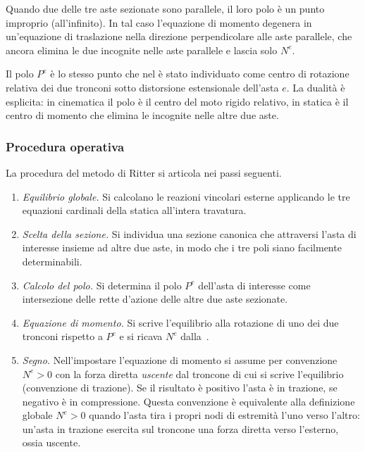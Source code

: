Quando due delle tre aste sezionate sono parallele,
il loro polo è un punto improprio (all'infinito).
In tal caso l'equazione di momento degenera in
un'equazione di traslazione nella direzione
perpendicolare alle aste parallele, che ancora
elimina le due incognite nelle aste parallele e
lascia solo $N^e$.

\begin{oss}
	Il polo $P^e$ è lo stesso punto che nel
	 è stato
	individuato come centro di rotazione relativa
	dei due tronconi sotto distorsione estensionale
	dell'asta $e$. La dualità è esplicita: in
	cinematica il polo è il centro del moto rigido
	relativo, in statica è il centro di momento che
	elimina le incognite nelle altre due aste.
\end{oss}

\subsubsection{Procedura operativa} La procedura del metodo di Ritter si articola nei
passi seguenti.

\begin{enumerate}[noitemsep]
	\item \emph{Equilibrio globale.} Si calcolano
	le reazioni vincolari esterne applicando
	le tre equazioni cardinali della statica
	all'intera travatura.
	\item \emph{Scelta della sezione.} Si individua
	una sezione canonica che attraversi l'asta
	di interesse insieme ad altre due aste, in
	modo che i tre poli siano facilmente
	determinabili.
	\item \emph{Calcolo del polo.} Si determina il
	polo $P^e$ dell'asta di interesse come
	intersezione delle rette d'azione delle
	altre due aste sezionate.
	\item \emph{Equazione di momento.} Si scrive
	l'equilibrio alla rotazione di uno dei due
	tronconi rispetto a $P^e$ e si ricava $N^e$
	dalla~.
	\item \emph{Segno.} Nell'impostare l'equazione
	di momento si assume per convenzione $N^e> 0$
	con la forza diretta \emph{uscente} dal troncone
	di cui si scrive l'equilibrio (convenzione di
	trazione). Se il risultato è positivo l'asta
	è in trazione, se negativo è in compressione.
	Questa convenzione è equivalente alla
	definizione globale $N^e > 0$ quando l'asta
	tira i propri nodi di estremità l'uno verso
	l'altro: un'asta in trazione esercita sul
	troncone una forza diretta verso l'esterno,
	ossia uscente.
\end{enumerate}

